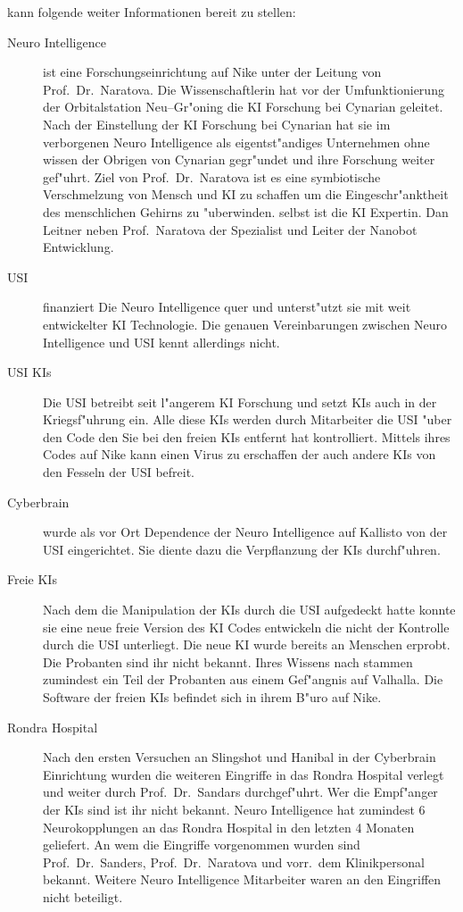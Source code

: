 \ml{} kann folgende weiter Informationen bereit zu stellen:

\begin{description}
	\item[Neuro Intelligence] ist eine Forschungseinrichtung auf Nike unter der Leitung von Prof.~Dr.~Naratova. Die Wissenschaftlerin hat 
		vor der Umfunktionierung der Orbitalstation Neu--Gr"oning die KI Forschung bei Cynarian geleitet. Nach der Einstellung der KI Forschung bei Cynarian hat sie im verborgenen Neuro Intelligence als eigentst"andiges Unternehmen ohne wissen der Obrigen von Cynarian gegr"undet und ihre Forschung weiter gef"uhrt. Ziel von Prof.~Dr.~Naratova ist es eine symbiotische Verschmelzung von Mensch und KI zu schaffen um die Eingeschr"anktheit des menschlichen Gehirns zu "uberwinden. \ml{} selbst ist die KI Expertin. Dan Leitner neben Prof.~Naratova der Spezialist und Leiter der Nanobot Entwicklung.
	\item[USI] finanziert Die Neuro Intelligence quer und unterst"utzt sie mit weit entwickelter KI Technologie. Die genauen Vereinbarungen 
		zwischen Neuro Intelligence und USI kennt \ml{} allerdings nicht.
		\item[USI KIs] Die USI betreibt seit l"angerem KI Forschung und setzt KIs auch in der Kriegsf"uhrung ein. Alle diese KIs werden 
		durch Mitarbeiter die USI "uber den Code den Sie bei den freien KIs entfernt hat kontrolliert. Mittels ihres Codes auf Nike kann \ml{} einen Virus zu erschaffen der auch andere KIs von den Fesseln der USI befreit.		
	\item[Cyberbrain] wurde als vor Ort Dependence der Neuro Intelligence auf Kallisto von der USI eingerichtet. Sie diente dazu die		
		Verpflanzung der KIs durchf"uhren.
	\item[Freie KIs] Nach dem \ml{} die Manipulation der KIs durch die USI aufgedeckt hatte konnte sie eine neue freie Version des KI Codes
		entwickeln die nicht der Kontrolle durch die USI unterliegt. Die neue KI wurde bereits an Menschen erprobt. Die Probanten sind ihr nicht bekannt. Ihres Wissens nach stammen zumindest ein Teil der Probanten aus einem Gef"angnis auf Valhalla. Die Software der freien KIs befindet sich in ihrem B"uro auf Nike.
	\item[Rondra Hospital] Nach den ersten Versuchen an Slingshot und Hanibal in der Cyberbrain Einrichtung wurden die weiteren Eingriffe 	
		in das Rondra Hospital verlegt und weiter durch Prof.~Dr.~Sandars durchgef"uhrt. Wer die Empf"anger der KIs sind ist ihr nicht bekannt. Neuro Intelligence hat zumindest 6 Neurokopplungen an das Rondra Hospital in den letzten 4 Monaten geliefert. An wem die Eingriffe vorgenommen wurden sind Prof.~Dr.~Sanders, Prof.~Dr.~Naratova und vorr.~dem Klinikpersonal bekannt. Weitere Neuro Intelligence Mitarbeiter waren an den Eingriffen nicht beteiligt.
\end{description}

